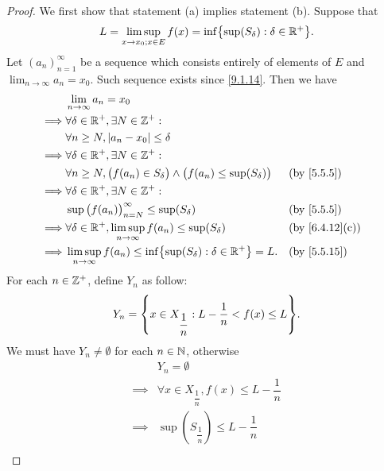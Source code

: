 \begin{proof}
  We first show that statement (a) implies statement (b).
  Suppose that
  \[
    L = \limsup_{x \to x_0 ; x \in E} f(x) = \inf\set{\sup(S_\delta) : \delta \in \R^+}.
  \]
  Let \((a_n)_{n = 1}^\infty\) be a sequence which consists entirely of elements of \(E\) and \(\lim_{n \to \infty} a_n = x_0\).
  Such sequence exists since \cref{9.1.14}.
  Then we have
  \begin{align*}
             & \lim_{n \to \infty} a_n = x_0                                                                                      \\
    \implies & \forall \delta \in \R^+, \exists N \in \Z^+ :                                                                      \\
             & \forall n \geq N, \abs{a_n - x_0} \leq \delta                                                                      \\
    \implies & \forall \delta \in \R^+, \exists N \in \Z^+ :                                                                      \\
             & \forall n \geq N, \big(f(a_n) \in S_{\delta}\big) \land \big(f(a_n) \leq \sup(S_{\delta})\big) &  & \by{5.5.5}     \\
    \implies & \forall \delta \in \R^+, \exists N \in \Z^+ :                                                                      \\
             & \sup\big(f(a_n)\big)_{n = N}^\infty \leq \sup(S_{\delta})                                      &  & \by{5.5.5}     \\
    \implies & \forall \delta \in \R^+, \limsup_{n \to \infty} f(a_n) \leq \sup(S_{\delta})                   &  & \by{6.4.12}[c] \\
    \implies & \limsup_{n \to \infty} f(a_n) \leq \inf\set{\sup(S_{\delta}) : \delta \in \R^+} = L.           &  & \by{5.5.15}
  \end{align*}
  For each \(n \in \mathbb{Z}^+\), define \(Y_n\) as follow:
  \[
    Y_n = \set{x \in X_{\dfrac{1}{n}} : L - \dfrac{1}{n} < f(x) \leq L}.
  \]
  We must have \(Y_n \neq \emptyset\) for each \(n \in \mathbb{N}\), otherwise
  \begin{align*}
             & Y_n = \emptyset                                                                                     \\
    \implies & \forall x \in X_{\dfrac{1}{n}}, f(x) \leq L - \dfrac{1}{n}                                          \\
    \implies & \sup(S_{\dfrac{1}{n}}) \leq L - \dfrac{1}{n}                                                        \\

\end{align*}
\end{proof}
